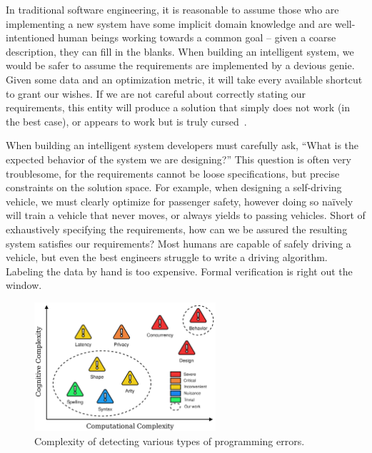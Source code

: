 
In traditional software engineering, it is reasonable to assume those who are implementing a new system have some implicit domain knowledge and are well-intentioned human beings working towards a common goal -- given a coarse description, they can fill in the blanks. When building an intelligent system, we would be safer to assume the requirements are implemented by a devious genie. Given some data and an optimization metric, it will take every available shortcut to grant our wishes. If we are not careful about correctly stating our requirements, this entity will produce a solution that simply does not work (in the best case), or appears to work but is truly cursed~\citep{bellman1957dynamic}.

When building an intelligent system developers must carefully ask, ``What is the expected behavior of the system we are designing?'' This question is often very troublesome, for the requirements cannot be loose specifications, but precise constraints on the solution space. For example, when designing a self-driving vehicle, we must clearly optimize for passenger safety, however doing so na\"ively will train a vehicle that never moves, or always yields to passing vehicles. Short of exhaustively specifying the requirements, how can we be assured the resulting system satisfies our requirements? Most humans are capable of safely driving a vehicle, but even the best engineers struggle to write a driving algorithm. Labeling the data by hand is too expensive. Formal verification is right out the window.

\begin{figure}
    \centering
    \includegraphics[width=0.60\textwidth]{../figures/verification_complexity.png}
    \caption{Complexity of detecting various types of programming errors.}
    \label{fig:verification_complexity}
\end{figure}

